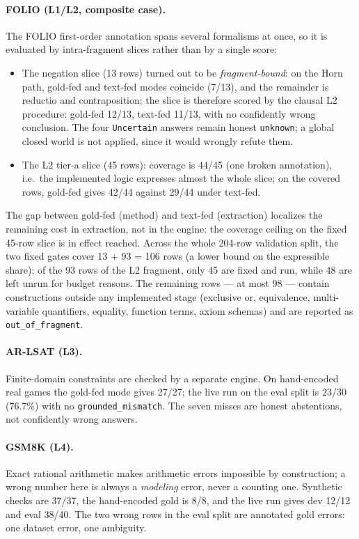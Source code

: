 \documentclass[11pt,a4paper]{article}
\begin{document}
\paragraph{FOLIO (L1/L2, composite case).} The FOLIO first-order annotation spans several
formalisms at once, so it is evaluated by intra-fragment slices rather than by a single
score:
\begin{itemize}
\item The negation slice (13 rows) turned out to be \emph{fragment-bound}: on the Horn path,
gold-fed and text-fed modes coincide (7/13), and the remainder is reductio and
contraposition; the slice is therefore scored by the clausal L2 procedure: gold-fed 12/13,
text-fed 11/13, with no confidently wrong conclusion. The four \texttt{Uncertain} answers
remain honest \texttt{unknown}; a global closed world is not applied, since it would wrongly
refute them.
\item The L2 tier-a slice (45 rows): coverage is 44/45 (one broken annotation), i.e.\ the
implemented logic expresses almost the whole slice; on the covered rows, gold-fed gives
42/44 against 29/44 under text-fed.
\end{itemize}
The gap between gold-fed (method) and text-fed (extraction) localizes the remaining cost in
extraction, not in the engine: the coverage ceiling on the fixed 45-row slice is in effect
reached. Across the whole 204-row validation split, the two fixed gates cover 13 + 93 = 106
rows (a lower bound on the expressible share); of the 93 rows of the L2 fragment, only 45
are fixed and run, while 48 are left unrun for budget reasons. The remaining rows --- at
most 98 --- contain constructions outside any implemented stage (exclusive or, equivalence,
multi-variable quantifiers, equality, function terms, axiom schemas) and are reported as
\texttt{out\_of\_fragment}.

\paragraph{AR-LSAT (L3).} Finite-domain constraints are checked by a separate engine. On
hand-encoded real games the gold-fed mode gives 27/27; the live run on the eval split is
23/30 (76.7\%) with no \texttt{grounded\_mismatch}. The seven misses are honest abstentions,
not confidently wrong answers.

\paragraph{GSM8K (L4).} Exact rational arithmetic makes arithmetic errors impossible by
construction; a wrong number here is always a \emph{modeling} error, never a counting one.
Synthetic checks are 37/37, the hand-encoded gold is 8/8, and the live run gives dev 12/12
and eval 38/40. The two wrong rows in the eval split are annotated gold errors: one dataset
error, one ambiguity.
\end{document}
